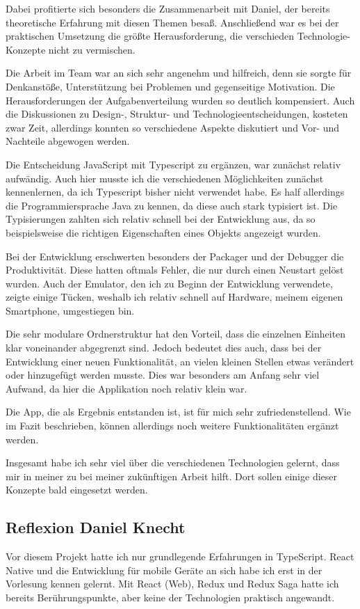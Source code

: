 Dabei profitierte sich besonders die Zusammenarbeit mit Daniel, der bereits theoretische Erfahrung mit diesen Themen besaß.
Anschließend war es bei der praktischen Umsetzung die größte Herausforderung, die verschieden Technologie-Konzepte
nicht zu vermischen.

Die Arbeit im Team war an sich sehr angenehm und hilfreich, denn sie  sorgte für Denkanstöße, Unterstützung bei Problemen und gegenseitige Motivation.
Die Herausforderungen der Aufgabenverteilung wurden so deutlich kompensiert.
Auch die Diskussionen zu Design-, Struktur- und Technologieentscheidungen, kosteten zwar Zeit, allerdings konnten so verschiedene Aspekte diskutiert und
Vor- und Nachteile abgewogen werden.

Die Entscheidung JavaScript mit Typescript zu ergänzen, war zunächst relativ aufwändig. Auch hier musste ich die verschiedenen Möglichkeiten zunächst kennenlernen,
 da ich Typescript bisher nicht verwendet habe. Es half allerdings die Programmiersprache Java zu kennen, da diese auch stark typisiert ist.
Die Typisierungen zahlten sich relativ schnell bei der Entwicklung aus, da so beispielsweise die richtigen Eigenschaften eines Objekts angezeigt wurden.

Bei der Entwicklung erschwerten besonders der Packager und der Debugger die Produktivität.
Diese hatten oftmals Fehler, die nur durch einen Neustart gelöst wurden. Auch der Emulator, den ich zu Beginn der Entwicklung
verwendete, zeigte einige Tücken, weshalb ich relativ schnell auf Hardware, meinem eigenen Smartphone, umgestiegen bin.

Die sehr modulare Ordnerstruktur hat den Vorteil, dass die einzelnen Einheiten klar voneinander abgegrenzt sind.
Jedoch bedeutet dies auch, dass bei der Entwicklung einer neuen Funktionalität, an vielen kleinen Stellen etwas verändert oder
hinzugefügt werden musste. Dies war besonders am Anfang sehr viel Aufwand, da hier die Applikation noch relativ klein war.

Die App, die als Ergebnis entstanden ist, ist für mich sehr zufriedenstellend. Wie im Fazit beschrieben, können allerdings
noch weitere Funktionalitäten ergänzt werden.

Insgesamt habe ich sehr viel über die verschiedenen Technologien gelernt, dass mir in meiner zu bei meiner zukünftigen Arbeit hilft.
Dort sollen einige dieser Konzepte bald eingesetzt werden.

\subsection{Reflexion Daniel Knecht}
Vor diesem Projekt hatte ich nur grundlegende Erfahrungen in TypeScript.
React Native und die Entwicklung  für mobile Geräte an sich habe ich erst in der Vorlesung kennen gelernt.
Mit React (Web), Redux und Redux Saga hatte ich bereits Berührungspunkte,
aber keine der Technologien praktisch angewandt.

